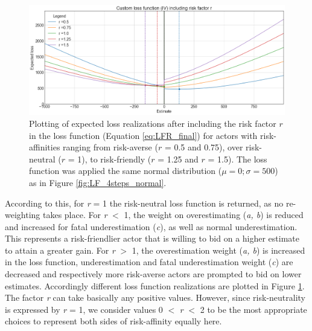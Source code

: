 		\begin{figure}[h]
			\centering
			\includegraphics[width=1\textwidth]{Figures/LFR_normal2.png}
			\caption{Plotting of expected loss realizations after including the risk factor $r$ in the loss function (Equation \ref{eq:LFR_final}) for actors with risk-affinities ranging from risk-averse ($r$ = 0.5 and 0.75), over risk-neutral ($r$ = 1), to risk-friendly ($r$ = 1.25 and $r$ = 1.5). The loss function was applied the same normal distribution ($\mu=0; \sigma=500$) as in Figure \ref{fig:LF_4steps_normal}.}\label{fig:LFR_normal} 
		\end{figure}
		According to this, for \textit{r} = 1 the risk-neutral loss function is returned, as no re-weighting takes place. For \textit{r} $<$ 1, the weight on overestimating (\textit{a, b}) is reduced and increased for fatal underestimation (\textit{c}), as well as normal underestimation. This represents a risk-friendlier actor that is willing to bid on a higher estimate to attain a greater gain. For \textit{r} $>$ 1, the overestimation weight (\textit{a, b}) is increased in the loss function, underestimation and fatal underestimation weight (\textit{c}) are decreased and respectively more risk-averse actors are prompted to bid on lower estimates. Accordingly different loss function realizations are plotted in Figure \ref{fig:LFR_normal}.\\		
		The factor \textit{r} can take basically any positive values. However, since risk-neutrality is expressed by \textit{r} = 1, we consider values 0 $<$ \textit{r} $<$ 2 to be the most appropriate choices to represent both sides of risk-affinity equally here.		
		
